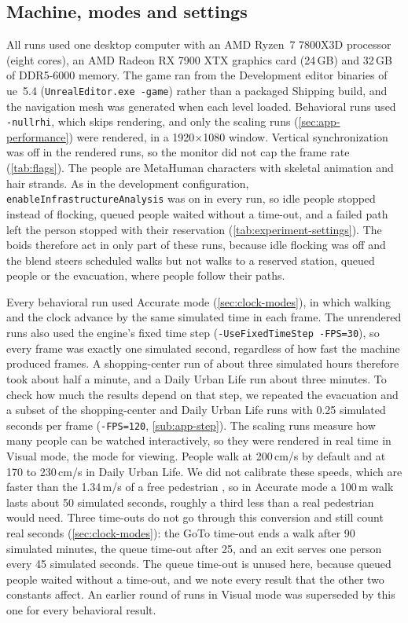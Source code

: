 \subsection{Machine, modes and settings}
\label{sub:app-settings}

All runs used one desktop computer with an AMD Ryzen~7 7800X3D processor (eight cores), an AMD Radeon RX 7900 XTX graphics card (24\,GB) and 32\,GB of DDR5-6000 memory. The game ran from the Development editor binaries of \gls{ue}~5.4 (\texttt{UnrealEditor.exe -game}) rather than a packaged Shipping build, and the navigation mesh was generated when each level loaded. Behavioral runs used \texttt{-nullrhi}, which skips rendering, and only the scaling runs (\cref{sec:app-performance}) were rendered, in a 1920$\times$1080 window. Vertical synchronization was off in the rendered runs, so the monitor did not cap the frame rate (\cref{tab:flags}). The people are MetaHuman characters with skeletal animation and hair strands. As in the development configuration, \texttt{enableInfrastructureAnalysis} was on in every run, so idle people stopped instead of flocking, queued people waited without a time-out, and a failed path left the person stopped with their reservation (\cref{tab:experiment-settings}). The boids therefore act in only part of these runs, because idle flocking was off and the blend steers scheduled walks but not walks to a reserved station, queued people or the evacuation, where people follow their paths.

Every behavioral run used Accurate mode (\cref{sec:clock-modes}), in which walking and the clock advance by the same simulated time in each frame. The unrendered runs also used the engine's fixed time step (\texttt{-UseFixedTimeStep -FPS=30}), so every frame was exactly one simulated second, regardless of how fast the machine produced frames. A shopping-center run of about three simulated hours therefore took about half a minute, and a Daily Urban Life run about three minutes. To check how much the results depend on that step, we repeated the evacuation and a subset of the shopping-center and Daily Urban Life runs with 0.25 simulated seconds per frame (\texttt{-FPS=120}, \cref{sub:app-step}). The scaling runs measure how many people can be watched interactively, so they were rendered in real time in Visual mode, the mode for viewing. People walk at 200\,cm/s by default and at 170 to 230\,cm/s in Daily Urban Life. We did not calibrate these speeds, which are faster than the 1.34\,m/s of a free pedestrian \citep{weidmann1993transporttechnik}, so in Accurate mode a 100\,m walk lasts about 50 simulated seconds, roughly a third less than a real pedestrian would need. Three time-outs do not go through this conversion and still count real seconds (\cref{sec:clock-modes}): the GoTo time-out ends a walk after 90 simulated minutes, the queue time-out after 25, and an exit serves one person every 45 simulated seconds. The queue time-out is unused here, because queued people waited without a time-out, and we note every result that the other two constants affect. An earlier round of runs in Visual mode was superseded by this one for every behavioral result.

